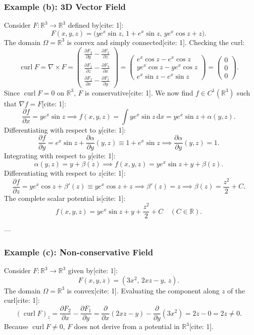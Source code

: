 \subsubsection*{Example (b): 3D Vector Field}
Consider $F \colon \mathbb{R}^3 \to \mathbb{R}^3$ defined by[cite: 1]:
\[
F(x, y, z) = \big(y e^x \sin z,\, 1 + e^x \sin z,\, y e^x \cos z + z\big).
\]
The domain $\Omega = \mathbb{R}^3$ is convex and simply connected[cite: 1]. Checking the curl:
\[
\operatorname{curl} F = \nabla \times F = 
\begin{pmatrix}
\frac{\partial F_3}{\partial y} - \frac{\partial F_2}{\partial z} \\[5pt]
\frac{\partial F_1}{\partial z} - \frac{\partial F_3}{\partial x} \\[5pt]
\frac{\partial F_2}{\partial x} - \frac{\partial F_1}{\partial y}
\end{pmatrix}
=
\begin{pmatrix}
e^x \cos z - e^x \cos z \\[5pt]
y e^x \cos z - y e^x \cos z \\[5pt]
e^x \sin z - e^x \sin z
\end{pmatrix}
= \begin{pmatrix} 0 \\ 0 \\ 0 \end{pmatrix}.
\]
Since $\operatorname{curl} F = 0$ on $\mathbb{R}^3$, $F$ is conservative[cite: 1]. We now find $f \in C^1(\mathbb{R}^3)$ such that $\nabla f = F$[cite: 1]:
\[
\frac{\partial f}{\partial x} = y e^x \sin z \implies f(x, y, z) = \int y e^x \sin z \,\mathrm{d}x = y e^x \sin z + \alpha(y, z).
\]
Differentiating with respect to $y$[cite: 1]:
\[
\frac{\partial f}{\partial y} = e^x \sin z + \frac{\partial \alpha}{\partial y}(y, z) \equiv 1 + e^x \sin z \implies \frac{\partial \alpha}{\partial y}(y, z) = 1.
\]
Integrating with respect to $y$[cite: 1]:
\[
\alpha(y, z) = y + \beta(z) \implies f(x, y, z) = y e^x \sin z + y + \beta(z).
\]
Differentiating with respect to $z$[cite: 1]:
\[
\frac{\partial f}{\partial z} = y e^x \cos z + \beta'(z) \equiv y e^x \cos z + z \implies \beta'(z) = z \implies \beta(z) = \frac{z^2}{2} + C.
\]
The complete scalar potential is[cite: 1]:
\[
f(x, y, z) = y e^x \sin z + y + \frac{z^2}{2} + C \quad (C \in \mathbb{R}).
\]

---

\subsubsection*{Example (c): Non-conservative Field}
Consider $F \colon \mathbb{R}^3 \to \mathbb{R}^3$ given by[cite: 1]:
\[
F(x, y, z) = (3x^2,\, 2xz - y,\, z).
\]
The domain $\Omega = \mathbb{R}^3$ is convex[cite: 1]. Evaluating the component along $z$ of the curl[cite: 1]:
\[
(\operatorname{curl} F)_z = \frac{\partial F_2}{\partial x} - \frac{\partial F_1}{\partial y} = \frac{\partial}{\partial x}(2xz - y) - \frac{\partial}{\partial y}(3x^2) = 2z - 0 = 2z \neq 0.
\]
Because $\operatorname{curl} F \neq 0$, $F$ does not derive from a potential in $\mathbb{R}^3$[cite: 1].


